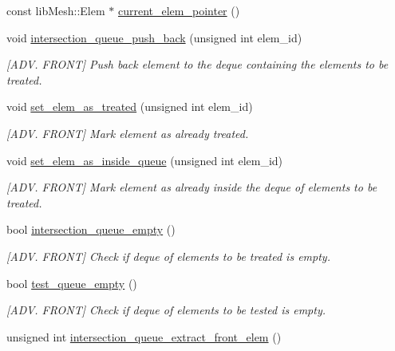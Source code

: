 \begin{DoxyCompactItemize}
const lib\+Mesh\+::\+Elem $\ast$ \hyperlink{classcarl_1_1_patch__construction_afdf767feed130d2a9b58dc586e5d3a20}{current\+\_\+elem\+\_\+pointer} ()
\item 
void \hyperlink{classcarl_1_1_patch__construction_abc44a4dda847749fcbc2ba02d2e0a203}{intersection\+\_\+queue\+\_\+push\+\_\+back} (unsigned int elem\+\_\+id)
\begin{DoxyCompactList}\small\item\em \mbox{[}A\+D\+V. F\+R\+O\+N\+T\mbox{]} Push back element to the deque containing the elements to be treated. \end{DoxyCompactList}\item 
void \hyperlink{classcarl_1_1_patch__construction_a6d8a9233b0cea51c522cd6c764bea8d6}{set\+\_\+elem\+\_\+as\+\_\+treated} (unsigned int elem\+\_\+id)
\begin{DoxyCompactList}\small\item\em \mbox{[}A\+D\+V. F\+R\+O\+N\+T\mbox{]} Mark element as already treated. \end{DoxyCompactList}\item 
void \hyperlink{classcarl_1_1_patch__construction_ac2a2c6ecb4addf3be82ec8d85167fe0b}{set\+\_\+elem\+\_\+as\+\_\+inside\+\_\+queue} (unsigned int elem\+\_\+id)
\begin{DoxyCompactList}\small\item\em \mbox{[}A\+D\+V. F\+R\+O\+N\+T\mbox{]} Mark element as already inside the deque of elements to be treated. \end{DoxyCompactList}\item 
bool \hyperlink{classcarl_1_1_patch__construction_a5e5e004d45f6a2fce09bece11adbe2f7}{intersection\+\_\+queue\+\_\+empty} ()
\begin{DoxyCompactList}\small\item\em \mbox{[}A\+D\+V. F\+R\+O\+N\+T\mbox{]} Check if deque of elements to be treated is empty. \end{DoxyCompactList}\item 
bool \hyperlink{classcarl_1_1_patch__construction_ac77c382f998b858317cab95cf1bfb57e}{test\+\_\+queue\+\_\+empty} ()
\begin{DoxyCompactList}\small\item\em \mbox{[}A\+D\+V. F\+R\+O\+N\+T\mbox{]} Check if deque of elements to be tested is empty. \end{DoxyCompactList}\item 
unsigned int \hyperlink{classcarl_1_1_patch__construction_acec494bba220f63123ad288055b5d5cb}{intersection\+\_\+queue\+\_\+extract\+\_\+front\+\_\+elem} ()

\end{DoxyCompactItemize}

